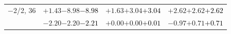 \documentclass[compress]{beamer}
\begin{document}
\begin{frame}
\begin{tabular}{r | c | c | c}
$-$2/2, 36 & $+1.43$\hspace{0.1 cm}$-8.98$\hspace{0.1 cm}\textcolor{black}{$-8.98$} & $+1.63$\hspace{0.1 cm}$+3.04$\hspace{0.1 cm}\textcolor{black}{$+3.04$} & $+2.62$\hspace{0.1 cm}$+2.62$\hspace{0.1 cm}\textcolor{black}{$+2.62$} \\
           & $-2.20$\hspace{0.1 cm}$-2.20$\hspace{0.1 cm}\textcolor{black}{$-2.21$} & $+0.00$\hspace{0.1 cm}$+0.00$\hspace{0.1 cm}\textcolor{black}{$+0.01$} & $-0.97$\hspace{0.1 cm}$+0.71$\hspace{0.1 cm}\textcolor{black}{$+0.71$} \\
\end{tabular}
\end{frame}
\end{document}
